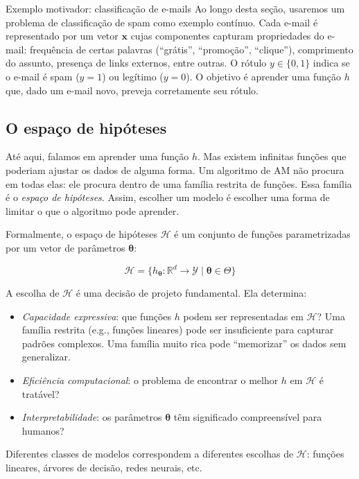 \documentclass[12pt,a4paper]{article}
\begin{document}
\begin{notabox}{Exemplo motivador: classificação de e-mails}
Ao longo desta seção, usaremos um problema de classificação de spam como exemplo contínuo. Cada e-mail é representado por um vetor $\mathbf{x}$ cujas componentes capturam propriedades do e-mail: frequência de certas palavras (``grátis'', ``promoção'', ``clique''), comprimento do assunto, presença de links externos, entre outras. O rótulo $y \in \{0, 1\}$ indica se o e-mail é spam ($y=1$) ou legítimo ($y=0$). O objetivo é aprender uma função $h$ que, dado um e-mail novo, preveja corretamente seu rótulo.
\end{notabox}

\subsection{O espaço de hipóteses}
\label{subsec:espaco-hipoteses}

Até aqui, falamos em aprender uma função $h$. Mas existem infinitas funções que poderiam ajustar os dados de alguma forma. Um algoritmo de AM não procura em todas elas: ele procura dentro de uma família restrita de funções. Essa família é o \emph{espaço de hipóteses}. Assim, escolher um modelo é escolher uma forma de limitar o que o algoritmo pode aprender.

Formalmente, o espaço de hipóteses $\mathcal{H}$ é um conjunto de funções parametrizadas por um vetor de parâmetros $\boldsymbol{\theta}$:

\[
\mathcal{H} = \{h_{\boldsymbol{\theta}} : \mathbb{R}^d \to \mathcal{Y} \mid \boldsymbol{\theta} \in \Theta\}
\]

A escolha de $\mathcal{H}$ é uma decisão de projeto fundamental. Ela determina:

\begin{itemize}
    \item \emph{Capacidade expressiva}: que funções $h$ podem ser representadas em $\mathcal{H}$? Uma família restrita (e.g., funções lineares) pode ser insuficiente para capturar padrões complexos. Uma família muito rica pode ``memorizar'' os dados sem generalizar.
    \item \emph{Eficiência computacional}: o problema de encontrar o melhor $h$ em $\mathcal{H}$ é tratável?
    \item \emph{Interpretabilidade}: os parâmetros $\boldsymbol{\theta}$ têm significado compreensível para humanos?
\end{itemize}

Diferentes classes de modelos correspondem a diferentes escolhas de $\mathcal{H}$: funções lineares, árvores de decisão, redes neurais, etc.
\end{document}
